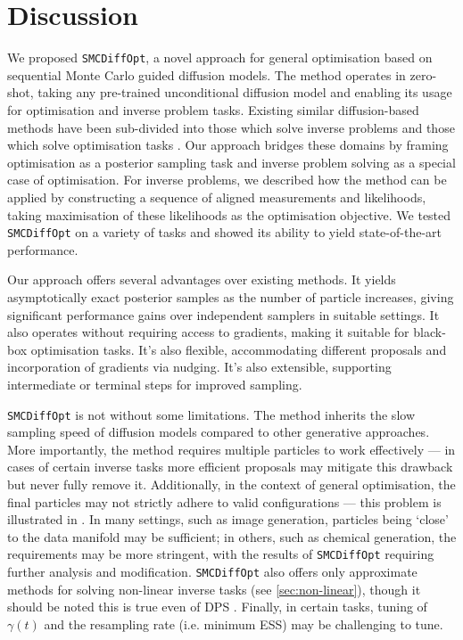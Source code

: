 \chapter{Discussion} \label{chap:discussion}

We proposed \texttt{SMCDiffOpt}, a novel approach for general optimisation based on sequential
Monte Carlo guided diffusion models. The method operates in zero-shot, taking any pre-trained
unconditional diffusion model and enabling its usage for optimisation and inverse problem tasks.
Existing similar diffusion-based methods have been sub-divided into those which solve inverse problems
\parencite{chungDiffusionPosteriorSampling2022,song2023pseudoinverseguided,boysTweedieMomentProjected2023,cardosoMonteCarloGuided2023,douDiffusionPosteriorSampling2023,wuPracticalAsymptoticallyExact2023}
and those which solve optimisation tasks
\parencite{kongDiffusionModelsConstrained2024,krishnamoorthyDiffusionModelsBlackBox2023,guoGradientGuidanceDiffusion2024}.
Our approach bridges these domains by framing optimisation as a posterior sampling task and inverse
problem solving as a special case of optimisation. For inverse problems, we described how the
method can be applied by constructing a sequence of aligned measurements and likelihoods, taking
maximisation of these likelihoods as the optimisation objective. We tested \texttt{SMCDiffOpt} on a
variety of tasks and showed its ability to yield state-of-the-art performance.

Our approach offers several advantages over existing methods. It yields asymptotically exact
posterior samples as the number of particle increases, giving significant performance gains over
independent samplers in suitable settings. It also operates without requiring access to gradients,
making it suitable for black-box optimisation tasks. It's also flexible, accommodating different
proposals and incorporation of gradients via nudging. It's also extensible, supporting intermediate
or terminal steps for improved sampling.

\texttt{SMCDiffOpt} is not without some limitations. The method inherits the slow sampling speed of
diffusion models compared to other generative approaches. More importantly, the method requires
multiple particles to work effectively --- in cases of certain inverse tasks more efficient
proposals may mitigate this drawback but never fully remove it. Additionally, in the context of
general optimisation, the final particles may not strictly adhere to valid configurations --- this
problem is illustrated in \textcite{guoGradientGuidanceDiffusion2024}. In many settings, such as
image generation, particles being `close' to the data manifold may be sufficient; in others, such
as chemical generation, the requirements may be more stringent, with the results of
\texttt{SMCDiffOpt} requiring further analysis and modification. \texttt{SMCDiffOpt} also offers
only approximate methods for solving non-linear inverse tasks (see \autoref{sec:non-linear}), though
it should be noted this is true even of DPS \parencite{chungDiffusionPosteriorSampling2022,boysTweedieMomentProjected2023}.
Finally, in certain tasks, tuning of $\gamma(t)$ and the resampling rate (i.e. minimum ESS) may be
challenging to tune.


